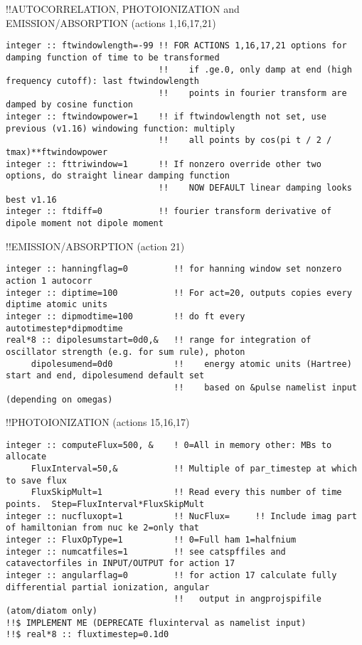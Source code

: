 !!{\large \quad AUTOCORRELATION, PHOTOIONIZATION and EMISSION/ABSORPTION (actions 1,16,17,21)}
\begin{verbatim}
integer :: ftwindowlength=-99 !! FOR ACTIONS 1,16,17,21 options for damping function of time to be transformed
                              !!    if .ge.0, only damp at end (high frequency cutoff): last ftwindowlength 
                              !!    points in fourier transform are damped by cosine function
integer :: ftwindowpower=1    !! if ftwindowlength not set, use previous (v1.16) windowing function: multiply
                              !!    all points by cos(pi t / 2 / tmax)**ftwindowpower 
integer :: fttriwindow=1      !! If nonzero override other two options, do straight linear damping function
                              !!    NOW DEFAULT linear damping looks best v1.16
integer :: ftdiff=0           !! fourier transform derivative of dipole moment not dipole moment
\end{verbatim}
!!{\large \quad EMISSION/ABSORPTION (action 21)}
\begin{verbatim}
integer :: hanningflag=0         !! for hanning window set nonzero action 1 autocorr
integer :: diptime=100           !! For act=20, outputs copies every diptime atomic units
integer :: dipmodtime=100        !! do ft every autotimestep*dipmodtime
real*8 :: dipolesumstart=0d0,&   !! range for integration of oscillator strength (e.g. for sum rule), photon
     dipolesumend=0d0            !!    energy atomic units (Hartree) start and end, dipolesumend default set
                                 !!    based on &pulse namelist input (depending on omegas)
\end{verbatim}
!!{\large \quad PHOTOIONIZATION (actions 15,16,17)}
\begin{verbatim}
integer :: computeFlux=500, &    ! 0=All in memory other: MBs to allocate
     FluxInterval=50,&           !! Multiple of par_timestep at which to save flux
     FluxSkipMult=1              !! Read every this number of time points.  Step=FluxInterval*FluxSkipMult
integer :: nucfluxopt=1          !! NucFlux=     !! Include imag part of hamiltonian from nuc ke 2=only that
integer :: FluxOpType=1          !! 0=Full ham 1=halfnium 
integer :: numcatfiles=1         !! see catspffiles and catavectorfiles in INPUT/OUTPUT for action 17
integer :: angularflag=0         !! for action 17 calculate fully differential partial ionization, angular
                                 !!   output in angprojspifile (atom/diatom only)
!!$ IMPLEMENT ME (DEPRECATE fluxinterval as namelist input) 
!!$ real*8 :: fluxtimestep=0.1d0
\end{verbatim}

